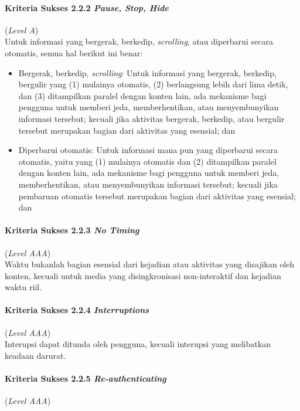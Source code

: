 \paragraph{Kriteria Sukses 2.2.2 \textit{Pause, Stop, Hide}}
\label{subsec:kriteria_2.2.2}
(\textit{Level A}) \\

Untuk informasi yang bergerak, berkedip, \textit{scrolling}, atau diperbarui secara otomatis, semua hal berikut ini benar:

\begin{itemize}
	\item Bergerak, berkedip, \textit{scrolling}: Untuk informasi yang bergerak, berkedip, bergulir yang (1) mulainya otomatis, (2) berlangsung lebih dari lima detik, dan (3) ditampilkan paralel dengan konten lain, ada mekanisme bagi pengguna untuk memberi jeda, memberhentikan, atau menyembunyikan informasi tersebut; kecuali jika aktivitas bergerak, berkedip, atau bergulir tersebut merupakan bagian dari aktivitas yang esensial; dan
	\item Diperbarui otomatis: Untuk informasi mana pun yang diperbarui secara otomatis, yaitu yang (1) mulainya otomatis dan (2) ditampilkan paralel dengan konten lain, ada mekanisme bagi pengguna untuk memberi jeda, memberhentikan, atau menyembunyikan informasi tersebut; kecuali jika pembaruan otomatis tersebut merupakan bagian dari aktivitas yang esensial; dan
\end{itemize}

\paragraph{Kriteria Sukses 2.2.3 \textit{No Timing}}
\label{subsec:kriteria_2.2.3}
(\textit{Level AAA}) \\

Waktu bukanlah bagian esensial dari kejadian atau aktivitas yang disajikan oleh konten, kecuali untuk media yang disingkronisasi non-interaktif dan kejadian waktu riil.

\paragraph{Kriteria Sukses 2.2.4 \textit{Interruptions}}
\label{subsec:kriteria_2.2.4}
(\textit{Level AAA}) \\

Interupsi dapat ditunda oleh pengguna, kecuali interupsi yang melibatkan keadaan darurat.

\paragraph{Kriteria Sukses 2.2.5 \textit{Re-authenticating}}
\label{subsec:kriteria_2.2.5}
(\textit{Level AAA}) \\

